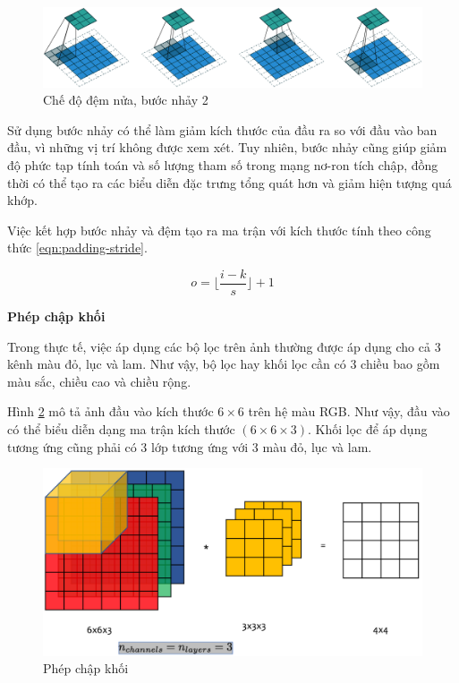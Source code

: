 \begin{figure}[h]
	\centering
	\includegraphics[width=0.9\linewidth]{images/half-padding-stride-2}
	\caption{Chế độ đệm nửa, bước nhảy 2}
	\label{fig:half-padding-stride-2}
\end{figure}

Sử dụng bước nhảy có thể làm giảm kích thước của đầu ra so với đầu vào ban đầu, vì những vị trí không được xem xét. Tuy nhiên, bước nhảy cũng giúp giảm độ phức tạp tính toán và số lượng tham số trong mạng nơ-ron tích chập, đồng thời có thể tạo ra các biểu diễn đặc trưng tổng quát hơn và giảm hiện tượng quá khớp.


Việc kết hợp bước nhảy và đệm tạo ra ma trận với kích thước tính theo công thức \ref{eqn:padding-stride}.

\begin{equation}\label{eqn:padding-stride}
	o = \lfloor{\frac{i-k}{s}}\rfloor + 1
\end{equation}

\textbf{Phép chập khối}

Trong thực tế, việc áp dụng các bộ lọc trên ảnh thường được áp dụng cho cả 3 kênh màu đỏ, lục và lam. Như vậy, bộ lọc hay khối lọc cần có 3 chiều bao gồm màu sắc, chiều cao và chiều rộng. 

Hình \ref{fig:single-filter-block-conv} mô tả ảnh đầu vào kích thước $6 \times 6$ trên hệ màu RGB. Như vậy, đầu vào có thể biểu diễn dạng ma trận kích thước $(6 \times 6 \times 3)$. Khối lọc để áp dụng tương ứng cũng phải có 3 lớp tương ứng với 3 màu đỏ, lục và lam.

\begin{figure}[h]
	\centering
	\includegraphics[width=0.8\linewidth]{images/single-filter-block-conv}
	\caption{Phép chập khối \cite{dl_ap_2018}}
	\label{fig:single-filter-block-conv}
\end{figure}

